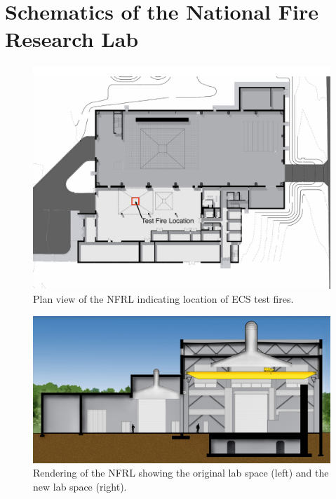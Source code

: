 \documentclass[12pt,oneside]{book}
\begin{document}
\chapter{Schematics of the National Fire Research Lab}
\label{app:nfrl_images}
\begin{figure}[!ht]
\includegraphics[width=\textwidth]{../Figures/plan_view2}
\caption {Plan view of the NFRL indicating location of ECS test fires.}
\label{fig:NFRL_plan}
\end{figure}

\begin{figure}[!ht]
\includegraphics[width=\textwidth]{../Figures/section_2}
\caption {Rendering of the NFRL showing the original lab space (left) and the new lab space (right).}
\label{fig:NFRL_render}
\end{figure}
\end{document}
